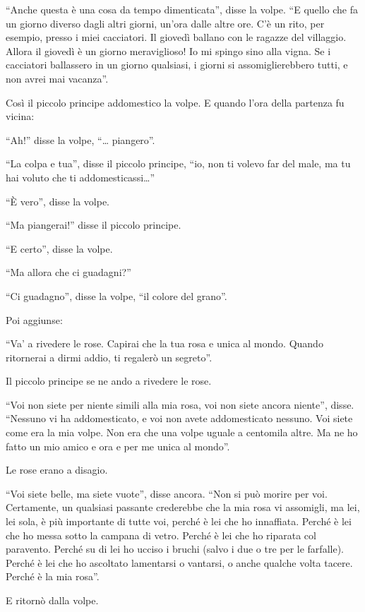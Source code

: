 \documentclass[11pt]{scrbook}
\begin{document}
``Anche questa è una cosa da tempo dimenticata'', disse la volpe. ``E quello che fa un giorno diverso dagli altri giorni, un'ora dalle altre ore. C'è un rito, per esempio, presso i miei cacciatori. Il giovedì ballano con le ragazze del villaggio. Allora il giovedì è un giorno meraviglioso! Io mi spingo sino alla vigna. Se i cacciatori ballassero in un giorno qualsiasi, i giorni si assomiglierebbero tutti, e non avrei mai vacanza''.

Così il piccolo principe addomestico la volpe. E quando l'ora della partenza fu vicina:

``Ah!'' disse la volpe, ``\ldots{} piangero''.

``La colpa e tua'', disse il piccolo principe, ``io, non ti volevo far del male, ma tu hai voluto che ti addomesticassi\ldots{}''

``È vero'', disse la volpe.

``Ma piangerai!'' disse il piccolo principe.

``E certo'', disse la volpe.

``Ma allora che ci guadagni?''

``Ci guadagno'', disse la volpe, ``il colore del grano''.

Poi aggiunse:

``Va' a rivedere le rose. Capirai che la tua rosa e unica al mondo. Quando ritornerai a dirmi addio, ti regalerò un segreto''.

Il piccolo principe se ne ando a rivedere le rose.

``Voi non siete per niente simili alla mia rosa, voi non siete ancora niente'', disse. ``Nessuno vi ha addomesticato, e voi non avete addomesticato nessuno. Voi siete come era la mia volpe. Non era che una volpe uguale a centomila altre. Ma ne ho fatto un mio amico e ora e per me unica al mondo''.

Le rose erano a disagio.

``Voi siete belle, ma siete vuote'', disse ancora. ``Non si può morire per voi. Certamente, un qualsiasi passante crederebbe che la mia rosa vi assomigli, ma lei, lei sola, è più importante di tutte voi, perché è lei che ho innaffiata. Perché è lei che ho messa sotto la campana di vetro. Perché è lei che ho riparata col paravento. Perché su di lei ho ucciso i bruchi (salvo i due o tre per le farfalle). Perché è lei che ho ascoltato lamentarsi o vantarsi, o anche qualche volta tacere. Perché è la mia rosa''.

E ritornò dalla volpe.
\end{document}
